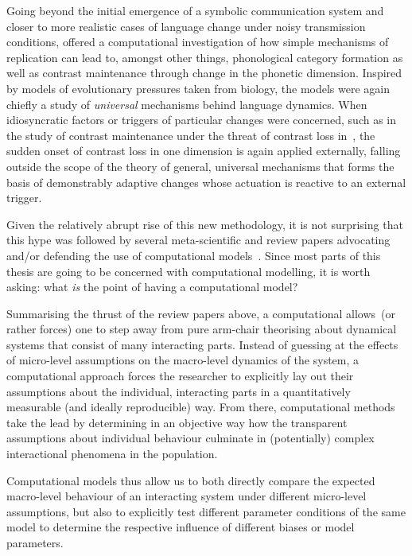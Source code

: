 Going beyond the initial emergence of a symbolic communication system and closer to more realistic cases of language change under noisy transmission conditions,
\citet{Wedel2004,Wedel2006} offered a computational investigation of how simple mechanisms of replication can lead to, amongst other things, phonological category formation as well as contrast maintenance through change in the phonetic dimension. Inspired by models of evolutionary pressures taken from biology, the models were again chiefly a study of \emph{universal} mechanisms behind language dynamics. When idiosyncratic factors or triggers of particular changes were concerned, such as in the study of contrast maintenance under the threat of contrast loss in~\citet{Wedel2006}, the sudden onset of contrast loss in one dimension is again applied externally, falling outside the scope of the theory of general, universal mechanisms that forms the basis of demonstrably adaptive changes whose actuation is reactive to an external trigger.

Given the relatively abrupt rise of this new methodology, it is not surprising that this hype was followed by several meta-scientific and review papers advocating and/or defending the use of computational models~\citep{DeBoer2006,Baker2008,Jaeger2009,Hruschka2009,Vogt2010,DeBoer2012EvoLang}.
Since most parts of this thesis are going to be concerned with computational modelling, it is worth asking: what \emph{is} the point of having a computational model?

Summarising the thrust of the review papers above, a computational allows~(or rather forces) one to step away from pure arm-chair theorising about dynamical systems that consist of many interacting parts. Instead of guessing at the effects of micro-level assumptions on the macro-level dynamics of the system, a computational approach forces the researcher to explicitly lay out their assumptions about the individual, interacting parts in a quantitatively measurable (and ideally reproducible) way. From there, computational methods take the lead by determining in an objective way how the transparent assumptions about individual behaviour culminate in (potentially) complex interactional phenomena in the population.

Computational models thus allow us to both directly compare the expected macro-level behaviour of an interacting system under different micro-level assumptions, but also to explicitly test different parameter conditions of the same model to determine the respective influence of different biases or model parameters.

